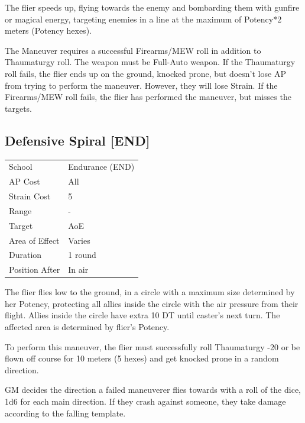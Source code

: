 \documentclass[11pt,a4paper,twocolumn]{book}
\begin{document}
\medskip

The flier speeds up, flying towards the enemy and bombarding them with gunfire or magical energy, targeting enemies in a line at the maximum of Potency*2 meters (Potency hexes).

The Maneuver requires a successful Firearms/MEW roll in addition to Thaumaturgy roll. The weapon must be Full-Auto weapon.
If the Thaumaturgy roll fails, the flier ends up on the ground, knocked prone, but doesn't lose AP from trying to perform the maneuver. However, they will lose Strain. If the Firearms/MEW roll fails, the flier has performed the maneuver, but misses the targets.


\subsection*{Defensive Spiral [END]}
{
	\begin{tabu} to 75mm{| X[l,4] | X[l,7] |}
		\hline
		School 			& Endurance (END) 	\\
        AP Cost	      	& All 				\\
        Strain Cost     & 5 				\\
        Range     		& - 				\\
        Target      	& AoE 				\\
        Area of Effect  & Varies 	 		\\
        Duration     	& 1 round	 		\\
		Position After  & In air 			\\ \hline
	\end{tabu}
		
}

\medskip

The flier flies low to the ground, in a circle with a maximum size determined by her Potency, protecting all allies inside the circle with the air pressure from their flight. Allies inside the circle have extra 10 DT until caster's next turn. The affected area is determined by flier's Potency.

To perform this maneuver, the flier must successfully roll Thaumaturgy -20 or be flown off course for 10 meters (5 hexes) and get knocked prone in a random direction.

GM decides the direction a failed maneuverer flies towards with a roll of the dice, 1d6 for each main direction. If they crash against someone, they take damage according to the falling template.
\end{document}

